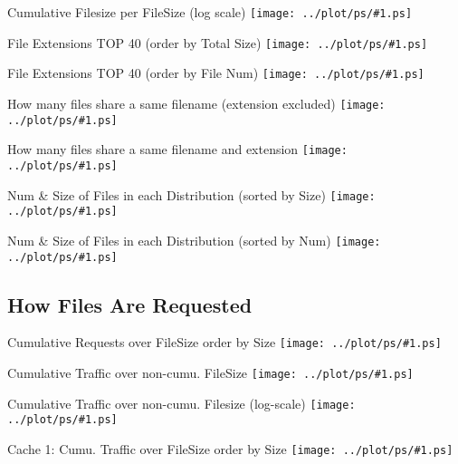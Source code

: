 \documentclass{beamer}
\newcommand\graph[1]{{\texttt{[image: ../plot/ps/\#1.ps]}}}
\begin{document}
\begin{frame}{Cumulative Filesize per FileSize (log scale)}
\graph{file-size-acc}
\end{frame}

\begin{frame}{File Extensions TOP 40 (order by Total Size)}
\graph{file-ext-top40}
\end{frame}

\begin{frame}{File Extensions TOP 40 (order by File Num)}
\graph{file-ext-top40-count}
\end{frame}

\begin{frame}{How many files share a same filename (extension excluded)}
\graph{file-same-filename}
\end{frame}

\begin{frame}{How many files share a same filename and extension}
\graph{file-same-filename-ext}
\end{frame}

\begin{frame}{Num \& Size of Files in each Distribution (sorted by Size)}
\graph{file-dist}
\end{frame}

\begin{frame}{Num \& Size of Files in each Distribution (sorted by Num)}
\graph{file-dist-num}
\end{frame}

\subsection{How Files Are Requested}

\begin{frame}{Cumulative Requests over FileSize order by Size}
\graph{file-req-all}
\end{frame}

\begin{frame}{Cumulative Traffic over non-cumu. FileSize}
\graph{file-traffic-all}
\end{frame}

\begin{frame}{Cumulative Traffic over non-cumu. Filesize (log-scale)}
\graph{file-traffic-all-log}
\end{frame}

\begin{frame}{Cache 1: Cumu. Traffic over FileSize order by Size}
\graph{file-traffic-size-acc}
\end{frame}
\end{document}
